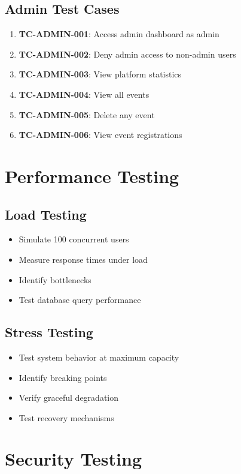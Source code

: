 \documentclass{scrreprt}
\begin{document}
\subsection{Admin Test Cases}
\begin{enumerate}
\item \textbf{TC-ADMIN-001}: Access admin dashboard as admin
\item \textbf{TC-ADMIN-002}: Deny admin access to non-admin users
\item \textbf{TC-ADMIN-003}: View platform statistics
\item \textbf{TC-ADMIN-004}: View all events
\item \textbf{TC-ADMIN-005}: Delete any event
\item \textbf{TC-ADMIN-006}: View event registrations
\end{enumerate}

\section{Performance Testing}

\subsection{Load Testing}
\begin{itemize}
\item Simulate 100 concurrent users
\item Measure response times under load
\item Identify bottlenecks
\item Test database query performance
\end{itemize}

\subsection{Stress Testing}
\begin{itemize}
\item Test system behavior at maximum capacity
\item Identify breaking points
\item Verify graceful degradation
\item Test recovery mechanisms
\end{itemize}

\section{Security Testing}
\end{document}
